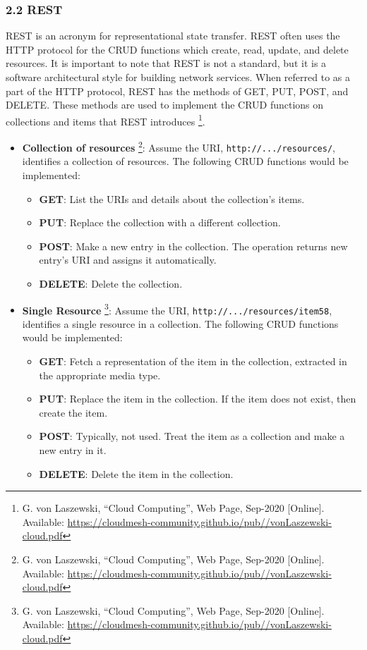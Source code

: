 \hypertarget{rest}{%
\subsubsection{2.2 REST}\label{rest}}

REST is an acronym for representational state transfer. REST often uses
the HTTP protocol for the CRUD functions which create, read, update, and
delete resources. It is important to note that REST is not a standard,
but it is a software architectural style for building network services.
When referred to as a part of the HTTP protocol, REST has the methods of
GET, PUT, POST, and DELETE. These methods are used to implement the CRUD
functions on collections and items that REST introduces \footnote{G. von
  Laszewski, ``Cloud Computing'', Web Page, Sep-2020 {[}Online{]}.
  Available:
  \url{https://cloudmesh-community.github.io/pub//vonLaszewski-cloud.pdf}}.

\begin{itemize}
\item
  \textbf{Collection of resources} \footnote{G. von Laszewski, ``Cloud
    Computing'', Web Page, Sep-2020 {[}Online{]}. Available:
    \url{https://cloudmesh-community.github.io/pub//vonLaszewski-cloud.pdf}}:
  Assume the URI, \texttt{http://.../resources/}, identifies a
  collection of resources. The following CRUD functions would be
  implemented:

  \begin{itemize}
  \tightlist
  \item
    \textbf{GET}: List the URIs and details about the collection's
    items.
  \item
    \textbf{PUT}: Replace the collection with a different collection.
  \item
    \textbf{POST}: Make a new entry in the collection. The operation
    returns new entry's URI and assigns it automatically.
  \item
    \textbf{DELETE}: Delete the collection.
  \end{itemize}
\item
  \textbf{Single Resource} \footnote{G. von Laszewski, ``Cloud
    Computing'', Web Page, Sep-2020 {[}Online{]}. Available:
    \url{https://cloudmesh-community.github.io/pub//vonLaszewski-cloud.pdf}}:
  Assume the URI, \texttt{http://.../resources/item58}, identifies a
  single resource in a collection. The following CRUD functions would be
  implemented:

  \begin{itemize}
  \tightlist
  \item
    \textbf{GET}: Fetch a representation of the item in the collection,
    extracted in the appropriate media type.
  \item
    \textbf{PUT}: Replace the item in the collection. If the item does
    not exist, then create the item.
  \item
    \textbf{POST}: Typically, not used. Treat the item as a collection
    and make a new entry in it.
  \item
    \textbf{DELETE}: Delete the item in the collection.
  \end{itemize}
\end{itemize}

